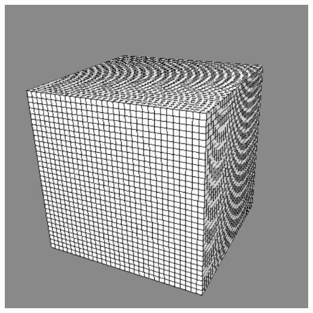 \begin{frame}
\begin{columns}
\begin{column}[b]{0.55\linewidth}
\includegraphics[scale=0.2]{figures/unifgrid.pdf}
\end{column}


\end{columns}
\end{frame}
